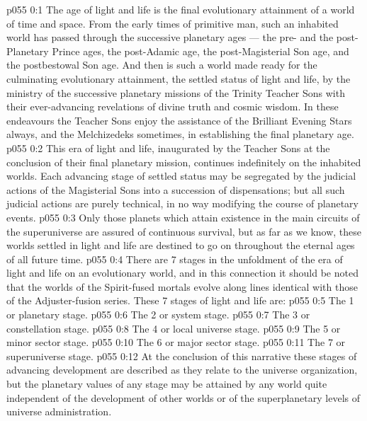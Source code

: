 \author{Mighty Messenger}
\vs p055 0:1 The age of light and life is the final evolutionary attainment of a world of time and space. From the early times of primitive man, such an inhabited world has passed through the successive planetary ages --- the pre\hyp{} and the post\hyp{}Planetary Prince ages, the post\hyp{}Adamic age, the post\hyp{}Magisterial Son age, and the postbestowal Son age. And then is such a world made ready for the culminating evolutionary attainment, the settled status of light and life, by the ministry of the successive planetary missions of the Trinity Teacher Sons with their ever\hyp{}advancing revelations of divine truth and cosmic wisdom. In these endeavours the Teacher Sons enjoy the assistance of the Brilliant Evening Stars always, and the Melchizedeks sometimes, in establishing the final planetary age.
\vs p055 0:2 This era of light and life, inaugurated by the Teacher Sons at the conclusion of their final planetary mission, continues indefinitely on the inhabited worlds. Each advancing stage of settled status may be segregated by the judicial actions of the Magisterial Sons into a succession of dispensations; but all such judicial actions are purely technical, in no way modifying the course of planetary events.
\vs p055 0:3 \pc Only those planets which attain existence in the main circuits of the superuniverse are assured of continuous survival, but as far as we know, these worlds settled in light and life are destined to go on throughout the eternal ages of all future time.
\vs p055 0:4 \pc There are 7 stages in the unfoldment of the era of light and life on an evolutionary world, and in this connection it should be noted that the worlds of the Spirit\hyp{}fused mortals evolve along lines identical with those of the Adjuster\hyp{}fusion series. These 7 stages of light and life are:
\vs p055 0:5 \bibnobreakspace The 1 or planetary stage.
\vs p055 0:6 \bibnobreakspace The 2 or system stage.
\vs p055 0:7 \bibnobreakspace The 3 or constellation stage.
\vs p055 0:8 \bibnobreakspace The 4 or local universe stage.
\vs p055 0:9 \bibnobreakspace The 5 or minor sector stage.
\vs p055 0:10 \bibnobreakspace The 6 or major sector stage.
\vs p055 0:11 \bibnobreakspace The 7 or superuniverse stage.
\vs p055 0:12 \pc At the conclusion of this narrative these stages of advancing development are described as they relate to the universe organization, but the planetary values of any stage may be attained by any world quite independent of the development of other worlds or of the superplanetary levels of universe administration.
